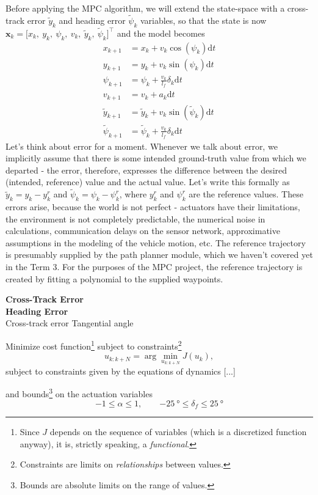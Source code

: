 \documentclass[a4paper]{article}
\begin{document}
Before applying the MPC algorithm, we will extend the state-space with a cross-track error \( \tilde{y}_k \) and heading error \( \tilde{\psi}_k \) variables, so that the state is now \( \bm{x}_k = \big[x_k,\ y_k,\ \psi_k,\ v_k,\ \tilde{y}_k,\ \tilde{\psi}_k \big]^\top \) and the model becomes
\begin{align}\label{eq:mpc_ssm_extended}
	x_{k+1} 			&= x_k + v_k\cos(\psi_k) \mathrm{d}t \\
	y_{k+1} 			&= y_k + v_k\sin(\psi_k) \mathrm{d}t \\
	\psi_{k+1} 			&= \psi_k + \frac{v_k}{l_f}\delta_k \mathrm{d}t \\
	v_{k+1} 			&= v_k + a_k\mathrm{d}t \\
	\tilde{y}_{k+1}		&= \tilde{y}_k + v_k\sin(\tilde{\psi}_k)\mathrm{d}t \\
	\tilde{\psi}_{k+1}	&= \tilde{\psi}_{k} + \frac{v_k}{l_f} \delta_k \mathrm{d}t
\end{align}
Let's think about error for a moment. 
Whenever we talk about error, we implicitly assume that there is some intended ground-truth value from which we departed - the error, therefore, expresses the difference between the desired (intended, reference) value and the actual value.
Let's write this formally as \( \tilde{y}_k = y_k - y^r_k \) and \( \tilde{\psi}_k = \psi_k - \psi^r_k \), where \( y^r_k \) and \( \psi^r_k \) are the reference values.
These errors arise, because the world is not perfect - actuators have their limitations, the environment is not completely predictable, the numerical noise in calculations, communication delays on the sensor network, approximative assumptions in the modeling of the vehicle motion, etc.
The reference trajectory is presumably supplied by the path planner module, which we haven't covered yet in the Term 3. 
For the purposes of the MPC project, the reference trajectory is created by fitting a polynomial to the supplied waypoints.


\textbf{Cross-Track Error} \\

\textbf{Heading Error} \\


Cross-track error
Tangential angle



Minimize cost function\footnote{Since \( J \) depends on the sequence of variables (which is a discretized function anyway), it is, strictly speaking, a \emph{functional}.} subject to constraints\footnote{Constraints are limits on \emph{relationships} between values.}
\begin{equation}\label{key}
	u_{k:k+N} = \arg\min_{u_{k:k+N}} J(u_k),
\end{equation}
subject to constraints given by the equations of dynamics [...]


and bounds\footnote{Bounds are absolute limits on the range of values.} on the actuation variables
\begin{equation}\label{eq:mpc_actuation_bounds}
	-1 \leq \alpha \leq 1 ,\qquad \SI{-25}{\degree} \leq \delta_f \leq \SI{25}{\degree}
\end{equation}





\end{document}
